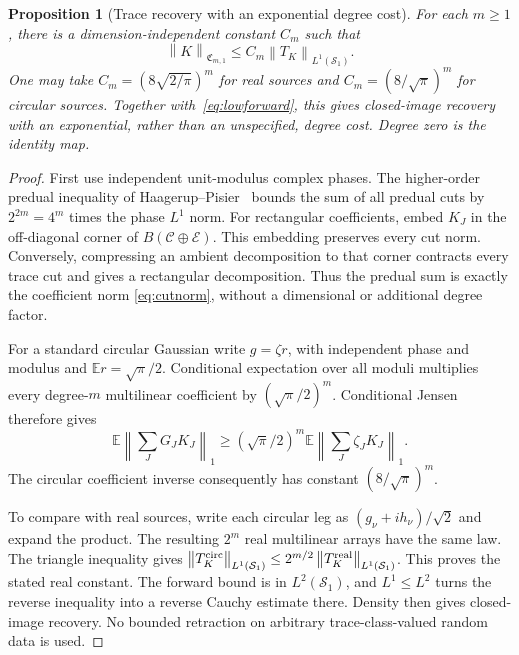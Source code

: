 \documentclass[11pt,a4paper]{amsart}
\numberwithin{equation}{section}
\newtheorem{proposition}[theorem]{Proposition}
\theoremstyle{definition}
\theoremstyle{remark}
\newcommand{\E}{\mathbb E}
\newcommand{\cC}{\mathcal C}
\newcommand{\cE}{\mathcal E}
\newcommand{\Sch}{\mathcal S}
\newcommand{\Coeff}{\mathfrak C}
\newcommand{\norm}[1]{\left\lVert#1\right\rVert}
\begin{document}
\begin{proposition}[Trace recovery with an exponential degree cost]\label{prop:traceendpoint}
For each $m\ge1$, there is a dimension-independent constant $C_m$ such that
\begin{equation}\label{eq:traceendpoint}
 \norm K_{\Coeff_{m,1}}\le C_m\norm{T_K}_{L^1(\Sch_1)}.
\end{equation}
One may take $C_m=(8\sqrt{2/\pi})^m$ for real sources and $C_m=(8/\sqrt\pi)^m$ for circular sources. Together with~\eqref{eq:lowforward}, this gives closed-image recovery with an exponential, rather than an unspecified, degree cost. Degree zero is the identity map.
\end{proposition}
\begin{proof}
First use independent unit-modulus complex phases. The higher-order predual inequality of Haagerup--Pisier~\cite[Theorem~3.5 and (3.8)--(3.11)]{HP} bounds the sum of all predual cuts by $2^{2m}=4^m$ times the phase $L^1$ norm. For rectangular coefficients, embed $K_J$ in the off-diagonal corner of $B(\cC\oplus\cE)$. This embedding preserves every cut norm. Conversely, compressing an ambient decomposition to that corner contracts every trace cut and gives a rectangular decomposition. Thus the predual sum is exactly the coefficient norm \eqref{eq:cutnorm}, without a dimensional or additional degree factor.

For a standard circular Gaussian write $g=\zeta r$, with independent phase and modulus and $\E r=\sqrt\pi/2$. Conditional expectation over all moduli multiplies every degree-$m$ multilinear coefficient by $(\sqrt\pi/2)^m$. Conditional Jensen therefore gives
\[
 \E\norm{\sum_JG_JK_J}_1
 \ge(\sqrt\pi/2)^m\E\norm{\sum_J\zeta_JK_J}_1.
\]
The circular coefficient inverse consequently has constant $(8/\sqrt\pi)^m$.

To compare with real sources, write each circular leg as $(g_\nu+ih_\nu)/\sqrt2$ and expand the product. The resulting $2^m$ real multilinear arrays have the same law. The triangle inequality gives
$\norm{T_K^{\rm circ}}_{L^1(\Sch_1)}\le2^{m/2}\norm{T_K^{\rm real}}_{L^1(\Sch_1)}$.
This proves the stated real constant. The forward bound is in $L^2(\Sch_1)$, and $L^1\le L^2$ turns the reverse inequality into a reverse Cauchy estimate there. Density then gives closed-image recovery. No bounded retraction on arbitrary trace-class-valued random data is used.
\end{proof}
\end{document}
